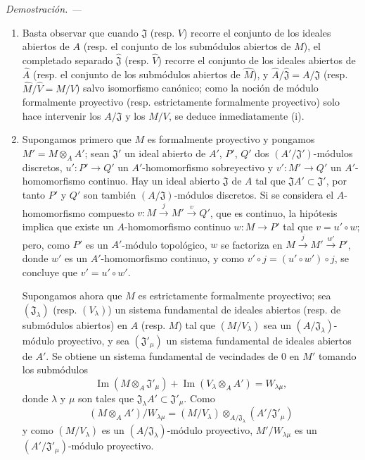 \documentclass[10pt,oneside]{book}
\newenvironment{proof}{%
  \par\medskip\noindent\textit{Demostración. ---\ }}{\par}
\begin{document}
\begin{proof}
\begin{enumerate}
  \item[(i)] Basta observar que cuando $\mathfrak J$ (resp. $V$)
  recorre el conjunto de los ideales abiertos de $A$ (resp. el conjunto de los
  submódulos abiertos de $M$), el completado separado $\hat{\mathfrak J}$
  (resp. $\hat V$) recorre el conjunto de los ideales abiertos de $\hat A$
  (resp. el conjunto de los submódulos abiertos de $\hat M$), y
  $\hat A/\hat{\mathfrak J}=A/\mathfrak J$ (resp.
  $\hat M/\hat V=M/V$) salvo isomorfismo canónico; como la noción
  de módulo formalmente proyectivo (resp. estrictamente formalmente proyectivo)
  solo hace intervenir los $A/\mathfrak J$ y los $M/V$, se deduce
  inmediatamente (i).
  \item[(ii)] Supongamos primero que $M$ es formalmente proyectivo y pongamos
  $M'=M\otimes_A A'$; sean $\mathfrak J'$ un ideal abierto de $A'$, $P'$,
  $Q'$ dos $(A'/\mathfrak J')$-módulos discretos, $u':P'\to Q'$ un
  $A'$-homomorfismo sobreyectivo y $v':M'\to Q'$ un $A'$-homomorfismo continuo.
  Hay un ideal abierto $\mathfrak J$ de $A$ tal que
  $\mathfrak JA'\subset\mathfrak J'$, por tanto $P'$ y $Q'$ son también
  $(A/\mathfrak J)$-módulos discretos. Si se considera el
  $A$-homomorfismo compuesto $v:M\xrightarrow{j}M'\xrightarrow{v}Q'$, que es
  continuo, la hipótesis implica que existe un $A$-homomorfismo continuo
  $w:M\to P'$ tal que $v=u'\circ w$; pero, como $P'$ es un $A'$-módulo
  topológico, $w$ se factoriza en
  $M\xrightarrow{j}M'\xrightarrow{w'}P'$, donde $w'$ es un $A'$-homomorfismo
  continuo, y como $v'\circ j=(u'\circ w')\circ j$, se concluye que
  $v'=u'\circ w'$.

  Supongamos ahora que $M$ es estrictamente formalmente proyectivo; sea
  $(\mathfrak J_\lambda)$ (resp. $(V_\lambda)$) un sistema fundamental
  de ideales abiertos (resp. de submódulos abiertos) en $A$ (resp. $M$) tal
  que $(M/V_\lambda)$ sea un $(A/\mathfrak J_\lambda)$-módulo proyectivo,
  y sea $(\mathfrak J'_\mu)$ un sistema fundamental de ideales abiertos de
  $A'$. Se obtiene un sistema fundamental de vecindades de $0$ en $M'$ tomando
  los submódulos
  \[
    \operatorname{Im}(M\otimes_A\mathfrak J'_\mu)
    +\operatorname{Im}(V_\lambda\otimes_A A')=W_{\lambda\mu},
  \]
  donde $\lambda$ y $\mu$ son tales que
  $\mathfrak J_\lambda A'\subset\mathfrak J'_\mu$. Como
  \[
    (M\otimes_A A')/W_{\lambda\mu}
    =(M/V_\lambda)\otimes_{A/\mathfrak J_\lambda}
      (A'/\mathfrak J'_\mu)
  \]
  y como $(M/V_\lambda)$ es un
  $(A/\mathfrak J_\lambda)$-módulo proyectivo, $M'/W_{\lambda\mu}$
  es un $(A'/\mathfrak J'_\mu)$-módulo proyectivo.
\end{enumerate}
\end{proof}
\end{document}

